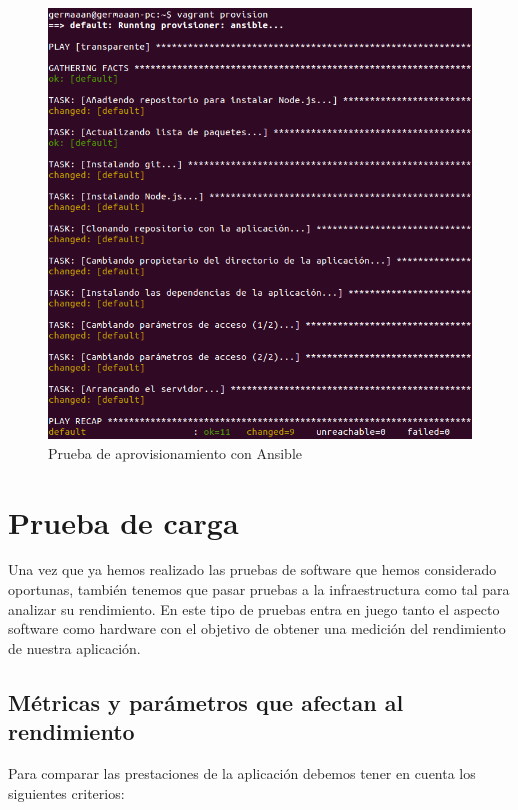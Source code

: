 \begin{figure}[!ht]
	\begin{center}
		\includegraphics[width=1\textwidth]{../images/provision.png}
		\caption{Prueba de aprovisionamiento con Ansible}
		\label{fig:deploy}
	\end{center}
\end{figure}

\newpage
\section{Prueba de carga}

Una vez que ya hemos realizado las pruebas de software que hemos considerado oportunas, también tenemos que pasar pruebas a la infraestructura como tal para analizar su rendimiento. En este tipo de pruebas entra en juego tanto el aspecto software como hardware con el objetivo de obtener una medición del rendimiento de nuestra aplicación.

\newpage
\subsection{Métricas y parámetros que afectan al rendimiento}

Para comparar las prestaciones de la aplicación debemos tener en cuenta los siguientes criterios:

